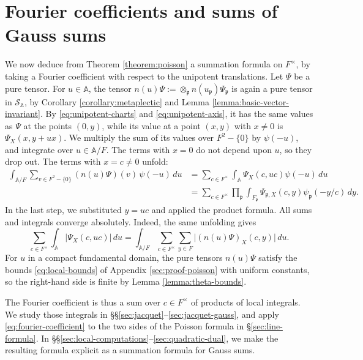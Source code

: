 \documentclass[reqno]{amsart}
\theoremstyle{plain}
\theoremstyle{definition}
\theoremstyle{itplain}
\numberwithin{equation}{section}
\numberwithin{theorem}{section}
\begin{document}
\section{Fourier coefficients and sums of Gauss sums}\label{sec:proof-main}
We now deduce from Theorem \ref{theorem:poisson} a summation formula on $F^\times$, by taking a Fourier coefficient with respect to the unipotent translations.  Let $\Psi$ be a pure tensor.  For $u \in \mathbb{A}$, the tensor $n(u) \Psi := \otimes_{\mathfrak{p}} n(u_{\mathfrak{p}}) \Psi_{\mathfrak{p}}$ is again a pure tensor in $\mathcal{S}_{\mathbb{A}}$, by Corollary \ref{corollary:metaplectic} and Lemma \ref{lemma:basic-vector-invariant}.  By \eqref{eq:unipotent-charts} and \eqref{eq:unipotent-axis}, it has the same values as $\Psi$ at the points $(0, y)$, while its value at a point $(x, y)$ with $x \neq 0$ is $\Psi_X(x, y + u x)$.  We multiply the sum of its values over $F^2 - \{0\}$ by $\psi(-u)$, and integrate over $u \in \mathbb{A} / F$.  The terms with $x = 0$ do not depend upon $u$, so they drop out.  The terms with $x = c \neq 0$ unfold:
\begin{equation}\label{eq:fourier-coefficient}
  \begin{aligned}
    \int_{\mathbb{A} / F} \sum_{v \in F^2 - \{0\}} (n(u) \Psi)(v) \, \psi(-u) \, d u
    &= \sum_{c \in F^\times} \int_{\mathbb{A}} \Psi_X(c, u c) \psi(-u) \, d u \\
    &= \sum_{c \in F^\times} \prod_{\mathfrak{p}} \int_{F_{\mathfrak{p}}} \Psi_{\mathfrak{p}, X}(c, y) \psi_{\mathfrak{p}}(- y / c) \, d y.
  \end{aligned}
\end{equation}
In the last step, we substituted $y = u c$ and applied the product formula.  All sums and integrals converge absolutely.  Indeed, the same unfolding gives
\begin{equation*}
  \sum_{c \in F^\times} \int_{\mathbb{A}} \lvert \Psi_X(c, u c) \rvert \, d u
  = \int_{\mathbb{A} / F} \sum_{c \in F^\times} \sum_{y \in F} \lvert (n(u) \Psi)_X(c, y) \rvert \, d u.
\end{equation*}
For $u$ in a compact fundamental domain, the pure tensors $n(u) \Psi$ satisfy the bounds \eqref{eq:local-bounds} of Appendix \ref{sec:proof-poisson} with uniform constants, so the right-hand side is finite by Lemma \ref{lemma:theta-bounds}.

The Fourier coefficient is thus a sum over $c \in F^\times$ of products of local integrals.  We study those integrals in \S\S\ref{sec:jacquet}--\ref{sec:jacquet-gauss}, and apply \eqref{eq:fourier-coefficient} to the two sides of the Poisson formula in \S\ref{sec:line-formula}.  In \S\S\ref{sec:local-computations}--\ref{sec:quadratic-dual}, we make the resulting formula explicit as a summation formula for Gauss sums.
\end{document}
